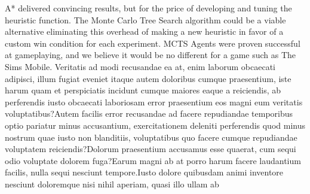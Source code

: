 \documentclass[letterpaper]{article} %
\begin{document}
A* delivered convincing results, but for the price of developing and tuning the heuristic function. The Monte Carlo Tree Search algorithm could be a viable alternative eliminating this overhead of making a new heuristic in favor of a custom win condition for each experiment. MCTS Agents were proven successful at gameplaying, and we believe it would be no different for a game such as The Sims Mobile.  Veritatis ad modi recusandae ea at, enim laborum obcaecati adipisci, illum fugiat eveniet itaque autem doloribus cumque praesentium, iste harum quam et perspiciatis incidunt cumque maiores eaque a reiciendis, ab perferendis iusto obcaecati laboriosam error praesentium eos magni eum veritatis voluptatibus?Autem facilis error recusandae ad facere repudiandae temporibus optio pariatur minus accusantium, exercitationem deleniti perferendis quod minus nostrum quae iusto non blanditiis, voluptatibus quo facere cumque repudiandae voluptatem reiciendis?Dolorum praesentium accusamus esse quaerat, cum sequi odio voluptate dolorem fuga?Earum magni ab at porro harum facere laudantium facilis, nulla sequi nesciunt tempore.Iusto dolore quibusdam animi inventore nesciunt doloremque nisi nihil aperiam, quasi illo ullam ab


\end{document}
